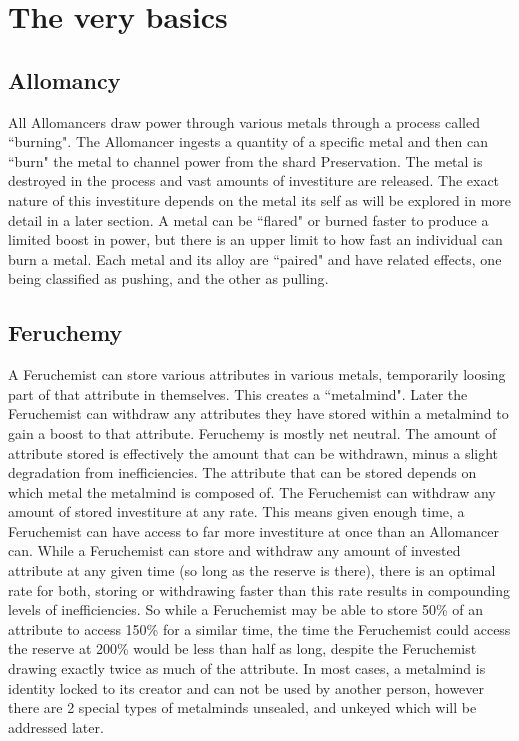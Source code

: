\documentclass[conference]{IEEEtran}
\begin{document}
\section*{The very basics}
\subsection*{Allomancy}
All Allomancers draw power through various metals through a process called ``burning".  The Allomancer ingests a quantity of a specific metal and then can ``burn" the metal to channel power from the shard Preservation\cite{allo-source}.  The metal is destroyed in the process and vast amounts of investiture are released.  The exact nature of this investiture depends on the metal its self as will be explored in more detail in a later section.  A metal can be ``flared" or burned faster to produce a limited boost in power, but there is an upper limit to how fast an individual can burn a metal.  Each metal and its alloy are ``paired" and have related effects, one being classified as pushing, and the other as pulling\cite{kelsier}.
\subsection*{Feruchemy}
A Feruchemist can store various attributes in various metals, temporarily loosing part of that attribute in themselves.  This creates a ``metalmind".  Later the Feruchemist can withdraw any attributes they have stored within a metalmind to gain a boost to that attribute.  Feruchemy is mostly net neutral.  The amount of attribute stored is effectively the amount that can be withdrawn, minus a slight degradation from inefficiencies.  The attribute that can be stored depends on which metal the metalmind is composed of.  The Feruchemist can withdraw any amount of stored investiture at any rate.  This means given enough time, a Feruchemist can have access to far more investiture at once than an Allomancer can\cite{TFE-fe}.
While a Feruchemist can store and withdraw any amount of invested attribute at any given time (so long as the reserve is there), there is an optimal rate for both, storing or withdrawing faster than this rate results in compounding levels of inefficiencies.   So while a Feruchemist may be able to store 50\% of an attribute to access 150\% for a similar time, the time the Feruchemist could access the reserve at 200\% would be less than half as long, despite the Feruchemist drawing exactly twice as much of the attribute\cite{fe-decay}. 
In most cases, a metalmind is identity locked to its creator and can not be used by another person, however there are 2 special types of metalminds unsealed, and unkeyed which will be addressed later\cite{BoM-CH3}.
\end{document}
